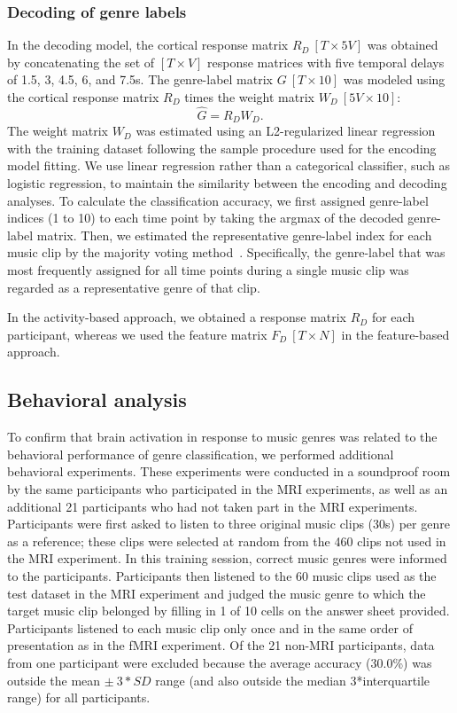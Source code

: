 \documentclass[journal]{IEEEtran}
\begin{document}
\subsubsection{Decoding of genre labels}
In the decoding model, the cortical response matrix $ R_D \ [T \times 5V] $ was obtained by concatenating the set of $ [T \times V] $ response matrices with five temporal delays of 1.5, 3, 4.5, 6, and 7.5s.
The genre-label matrix $ G \ [T \times 10] $ was modeled using the cortical response matrix $ R_D $ times the weight matrix $ W_D \ [5V \times 10] $:
\begin{equation}\label{equ:genre_label_matrix}
	\hat{G} = R_D W_D.
\end{equation}
The weight matrix $ W_D $ was estimated using an L2-regularized linear regression with the training dataset following the sample procedure used for the encoding model fitting.
We use linear regression rather than a categorical classifier, such as logistic regression, to maintain the similarity between the encoding and decoding analyses.
To calculate the classification accuracy, we first assigned genre-label indices (1 to 10) to each time point by taking the argmax of the decoded genre-label matrix.
Then, we estimated the representative genre-label index for each music clip by the majority voting method~\cite{jang2008music}.
Specifically, the genre-label that was most frequently assigned for all time points during a single music clip was regarded as a representative genre of that clip.

In the activity-based approach, we obtained a response matrix $ R_D $ for each participant, whereas we used the feature matrix $ F_D \ [T \times N]$ in the feature-based approach.


\subsection{Behavioral analysis}
To confirm that brain activation in response to music genres was related to the behavioral performance of genre classification, we performed additional behavioral experiments.
These experiments were conducted in a soundproof room by the same participants who participated in the MRI experiments, as well as an additional 21 participants who had not taken part in the MRI experiments.
Participants were first asked to listen to three original music clips (30s) per genre as a reference;
these clips were selected at random from the 460 clips not used in the MRI experiment.
In this training session, correct music genres were informed to the participants.
Participants then listened to the 60 music clips used as the test dataset in the MRI experiment and judged the music genre to which the target music clip belonged by filling in 1 of 10 cells on the answer sheet provided.
Participants listened to each music clip only once and in the same order of presentation as in the fMRI experiment.
Of the 21 non-MRI participants, data from one participant were excluded because the average accuracy (30.0\%) was outside the mean $ \pm \ 3*SD $ range (and also outside the median 3*interquartile range) for all participants.
\end{document}
